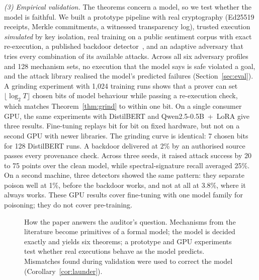 \emph{(3) Empirical validation.} The theorems concern a model, so we test whether the model
is faithful. We built a prototype pipeline with real cryptography (Ed25519 receipts, Merkle
commitments, a witnessed transparency log), trusted execution \emph{simulated} by key
isolation, real training on a public sentiment corpus with
exact re-execution, a published backdoor detector~\cite{tran2018spectral}, and an adaptive
adversary that tries every combination of its available attacks. Across all six adversary
profiles and 128 mechanism sets, no execution that the model says is safe violated a goal,
and the attack library realised the model's predicted failures (Section~\ref{sec:eval}). A
grinding experiment with 1,024 training runs shows that a prover can set
$\lfloor\log_2T\rfloor$ chosen bits of model behaviour while passing a re-execution check,
which matches Theorem~\ref{thm:grind} to within one bit. On a single consumer GPU, the same experiments with DistilBERT and Qwen2.5-0.5B~+~LoRA give
three results. Fine-tuning replays bit for bit on fixed hardware, but not on a second GPU
with newer libraries. The grinding curve is
identical: 7 chosen bits for 128 DistilBERT runs. A backdoor delivered at 2\% by an authorised source passes every provenance check.
Across three seeds, it raised attack success by 20 to 75 points over the clean model, while
spectral-signature recall averaged 25\%. On a second machine, three detectors showed the
same pattern: they separate poison well at 1\%, before the backdoor works, and not at all at
3.8\%, where it always works. These GPU results cover fine-tuning with one model family for
poisoning; they do not cover pre-training.

\begin{figure}[t]
\centering
\resizebox{\textwidth}{!}{}
\caption{How the paper answers the auditor's question. Mechanisms from the literature become
primitives of a formal model; the model is decided exactly and yields six theorems; a prototype
and GPU experiments test whether real executions behave as the model predicts. Mismatches found
during validation were used to correct the model (Corollary~\ref{cor:launder}).}
\label{fig:overview}
\end{figure}

